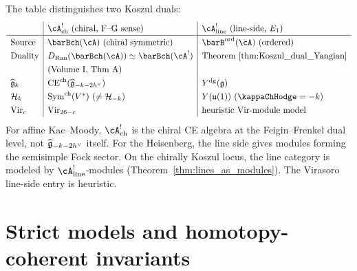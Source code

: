 \smallskip\noindent
The table distinguishes two Koszul duals:
\[
\renewcommand{\arraystretch}{1.3}
\begin{array}{l|l|l}
 & \cA^!_{\mathrm{ch}}\ (\text{chiral, F--G sense}) &
 \cA^!_{\mathrm{line}}\ (\text{line-side, } E_1) \\
\hline
\text{Source} &
 \barBch(\cA)\ (\text{chiral symmetric}) &
 \barB^{\mathrm{ord}}(\cA)\ (\text{ordered}) \\
\text{Duality} &
 D_{\mathrm{Ran}}(\barBch(\cA)) \simeq \barBch(\cA^!) &
 \text{Theorem~\ref{thm:Koszul_dual_Yangian}} \\
 & (\text{Volume~I, Thm~A}) & \\
\widehat{\fg}_k &
 \mathrm{CE}^{\mathrm{ch}}(\widehat{\fg}_{-k-2h^\vee}) &
 \Ydg(\fg) \\
\cH_k &
 \mathrm{Sym}^{\mathrm{ch}}(V^*)\ (\ne \cH_{-k}) &
 Y(\mathfrak{u}(1))\ (\kappaChHodge = -k) \\
\operatorname{Vir}_c &
 \operatorname{Vir}_{26-c} &
 \text{heuristic Vir-module model}
\end{array}
\]
For affine Kac--Moody, $\cA^!_{\mathrm{ch}}$ is the chiral CE
algebra at the Feigin--Frenkel dual level, not
$\widehat{\mathfrak{g}}_{-k-2h^\vee}$ itself. For the Heisenberg, the line side gives modules forming
the semisimple Fock sector. On the chirally Koszul locus, the
line category is modeled by $\cA^!_{\mathrm{line}}$-modules
(Theorem~\ref{thm:lines_as_modules}). The Virasoro line-side
entry is heuristic.

\section*{Strict models and homotopy-coherent invariants}

